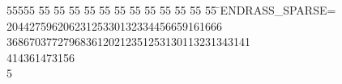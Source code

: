 %
%
\begin{tabbing}
55555 \= 55 \= 55 \= 55 \= 55 \= 55 \= 55 \= 55 \= 55 \= 55 \= 55 \= 55 \= 55 \= \>ENDRASS\_SPARSE=\\[0pt]
20442759620623125330132334456659161666\ \\[0pt]
3686703772796836120212351253130113231343141\ \\[0pt]
414361473156\\[0pt]
5\>\end{tabbing}
